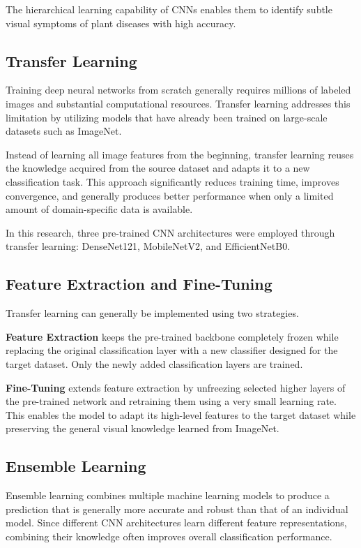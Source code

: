 The hierarchical learning capability of CNNs enables them to identify subtle visual symptoms of plant diseases with high accuracy.

\subsection{Transfer Learning}

Training deep neural networks from scratch generally requires millions of labeled images and substantial computational resources. Transfer learning addresses this limitation by utilizing models that have already been trained on large-scale datasets such as ImageNet.

Instead of learning all image features from the beginning, transfer learning reuses the knowledge acquired from the source dataset and adapts it to a new classification task. This approach significantly reduces training time, improves convergence, and generally produces better performance when only a limited amount of domain-specific data is available.

In this research, three pre-trained CNN architectures were employed through transfer learning: DenseNet121, MobileNetV2, and EfficientNetB0.

\subsection{Feature Extraction and Fine-Tuning}

Transfer learning can generally be implemented using two strategies.

\textbf{Feature Extraction} keeps the pre-trained backbone completely frozen while replacing the original classification layer with a new classifier designed for the target dataset. Only the newly added classification layers are trained.

\textbf{Fine-Tuning} extends feature extraction by unfreezing selected higher layers of the pre-trained network and retraining them using a very small learning rate. This enables the model to adapt its high-level features to the target dataset while preserving the general visual knowledge learned from ImageNet.

\subsection{Ensemble Learning}

Ensemble learning combines multiple machine learning models to produce a prediction that is generally more accurate and robust than that of an individual model. Since different CNN architectures learn different feature representations, combining their knowledge often improves overall classification performance.

